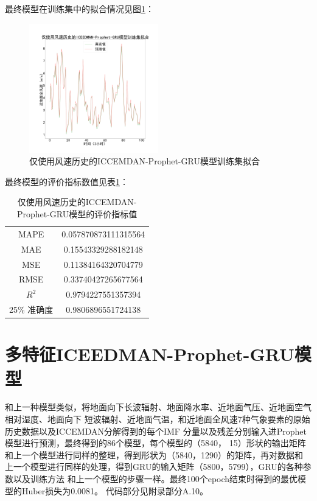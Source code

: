 \documentclass[AutoFakeBold]{LZUThesis}
\begin{document}
最终模型在训练集中的拟合情况见图\ref{fig_wind_prophet_gru_predict_train}：

\begin{figure}[H]
	\centering
    \includegraphics[width=0.5\textwidth]{figures/wind_prophet_gru_predict_train.pdf}
    \caption{仅使用风速历史的ICCEMDAN-Prophet-GRU模型训练集拟合}
    \label{fig_wind_prophet_gru_predict_train}
\end{figure}

最终模型的评价指标数值见表\ref{wind_prophet_gru_result}：

\begin{table}[H]
    \centering
    \caption{仅使用风速历史的ICCEMDAN-Prophet-GRU模型的评价指标值}
    \begin{tabular}{cc}
    \toprule
    MAPE & 0.057870873111315564 \\
    MAE & 0.15543329288182148 \\
    MSE & 0.11384164320704779 \\
    RMSE & 0.33740427265677564 \\
    $R^2$ & 0.9794227551357394 \\
    25\% 准确度 & 0.9806896551724138 \\
    \bottomrule
    \end{tabular}
    \label{wind_prophet_gru_result}
\end{table}

\section{多特征ICEEDMAN-Prophet-GRU模型}

和上一种模型类似，将地面向下长波辐射、地面降水率、近地面气压、近地面空气相对湿度、地面向下
短波辐射、近地面气温，和近地面全风速7种气象要素的原始历史数据以及ICCEMDAN分解得到的每个IMF
分量以及残差分别输入进Prophet模型进行预测，最终得到的86个模型，每个模型的（5840，
15）形状的输出矩阵和上一个模型进行同样的整理，得到形状为（5840，1290）的矩阵，再对数据和
上一个模型进行同样的处理，得到GRU的输入矩阵（5800，5799），GRU的各种参数以及训练方法
和上一个模型的步骤一样。最终100个epoch结束时得到的最优模型的Huber损失为0.0081。
代码部分见附录部分A.10。
\end{document}
